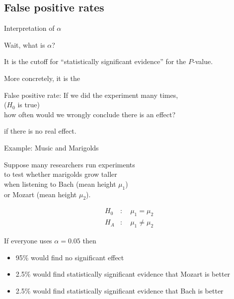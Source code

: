 \subsection{False positive rates}
\begin{frame}{Interpretation of $\alpha$}

    Wait, what is $\alpha$?

  \vspace{2em}
  \pause

  It is the \alert{cutoff} for ``statistically significant evidence''
  for the $P$-value.

    \vspace{2em}

    More concretely, it is the 
  \begin{block}{False positive rate:}
    If we did the experiment many times,\\
     ($H_0$ is true)\\
    how often would we \alert{wrongly} conclude there is an effect?
  \end{block}

  \pause
    \vspace{2em}
     if there is \alert{no} real effect.

\end{frame}



\begin{frame}{Example: Music and Marigolds}

    Suppose many researchers run experiments\\
    to test whether marigolds grow taller \\
    when listening to Bach (mean height $\mu_1$) \\
    or Mozart (mean height $\mu_2$). 


    \vspace{2em}

    \begin{align*}
        H_0 &: \quad \mu_1 = \mu_2  \\
        H_A &: \quad \mu_1 \neq \mu_2 
    \end{align*}

    \vspace{2em}

    If everyone uses $\alpha=0.05$ then
    \begin{itemize}
        \item 95\% would find no significant effect
        \item 2.5\% would find statistically significant evidence that Mozart is better
        \item 2.5\% would find statistically significant evidence that Bach is better
    \end{itemize}

\end{frame}

